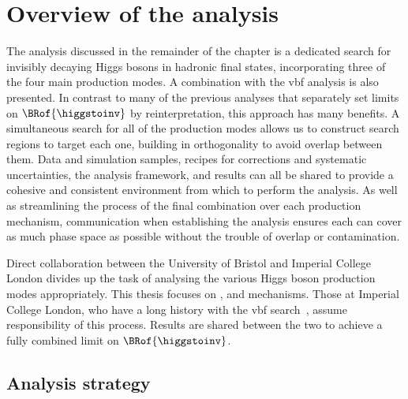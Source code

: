 \section{Overview of the analysis}
\label{sec:htoinv_analysis_overview}

The analysis discussed in the remainder of the chapter is a dedicated search for invisibly decaying Higgs bosons in hadronic final states, incorporating three of the four main production modes. A combination with the \acrshort{vbf} analysis is also presented. In contrast to many of the previous analyses that separately set limits on $\BRof{\higgstoinv}$ by reinterpretation, this approach has many benefits. A simultaneous search for all of the production modes allows us to construct search regions to target each one, building in orthogonality to avoid overlap between them. Data and simulation samples, recipes for corrections and systematic uncertainties, the analysis framework, and results can all be shared to provide a cohesive and consistent environment from which to perform the analysis. As well as streamlining the process of the final combination over each production mechanism, communication when establishing the analysis ensures each can cover as much phase space as possible without the trouble of overlap or contamination.

Direct collaboration between the University of Bristol and Imperial College London divides up the task of analysing the various Higgs boson production modes appropriately. This thesis focuses on \ttH, \VH and \ggH mechanisms. Those at Imperial College London, who have a long history with the \acrshort{vbf} search~\cite{Chatrchyan:2014tja,Sirunyan:2018owy}, assume responsibility of this process. Results are shared between the two to achieve a fully combined limit on $\BRof{\higgstoinv}$.



\subsection{Analysis strategy}
\label{subsec:htoinv_analysis_strategy}

